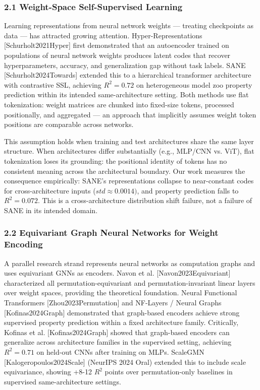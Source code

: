 
\subsubsection{2.1 Weight-Space Self-Supervised Learning}

Learning representations from neural network weights --- treating checkpoints as data --- has attracted growing attention. Hyper-Representations [Schurholt2021Hyper] first demonstrated that an autoencoder trained on populations of neural network weights produces latent codes that recover hyperparameters, accuracy, and generalization gap without task labels. SANE [Schurholt2024Towards] extended this to a hierarchical transformer architecture with contrastive SSL, achieving $R^{2}=0.72$ on heterogeneous model zoo property prediction within its intended same-architecture setting. Both methods use flat tokenization: weight matrices are chunked into fixed-size tokens, processed positionally, and aggregated --- an approach that implicitly assumes weight token positions are comparable across networks.

This assumption holds when training and test architectures share the same layer structure. When architectures differ substantially (e.g., MLP/CNN vs. ViT), flat tokenization loses its grounding: the positional identity of tokens has no consistent meaning across the architectural boundary. Our work measures the consequence empirically: SANE's representations collapse to near-constant codes for cross-architecture inputs ($std\approx 0.0014)$, and property prediction falls to $R^{2}=0.072$. This is a cross-architecture distribution shift failure, not a failure of SANE in its intended domain.

\subsubsection{2.2 Equivariant Graph Neural Networks for Weight Encoding}

A parallel research strand represents neural networks as computation graphs and uses equivariant GNNs as encoders. Navon et al. [Navon2023Equivariant] characterized all permutation-equivariant and permutation-invariant linear layers over weight spaces, providing the theoretical foundation. Neural Functional Transformers [Zhou2023Permutation] and NF-Layers / Neural Graphs [Kofinas2024Graph] demonstrated that graph-based encoders achieve strong supervised property prediction within a fixed architecture family. Critically, Kofinas et al. [Kofinas2024Graph] \citep{ICLR2024} showed that graph-based encoders can generalize across architecture families in the supervised setting, achieving $R^{2}=0.71$ on held-out CNNs after training on MLPs. ScaleGMN [Kalogeropoulos2024Scale] (NeurIPS 2024 Oral) extended this to include scale equivariance, showing +8-12 $R^2$ points over permutation-only baselines in supervised same-architecture settings.


